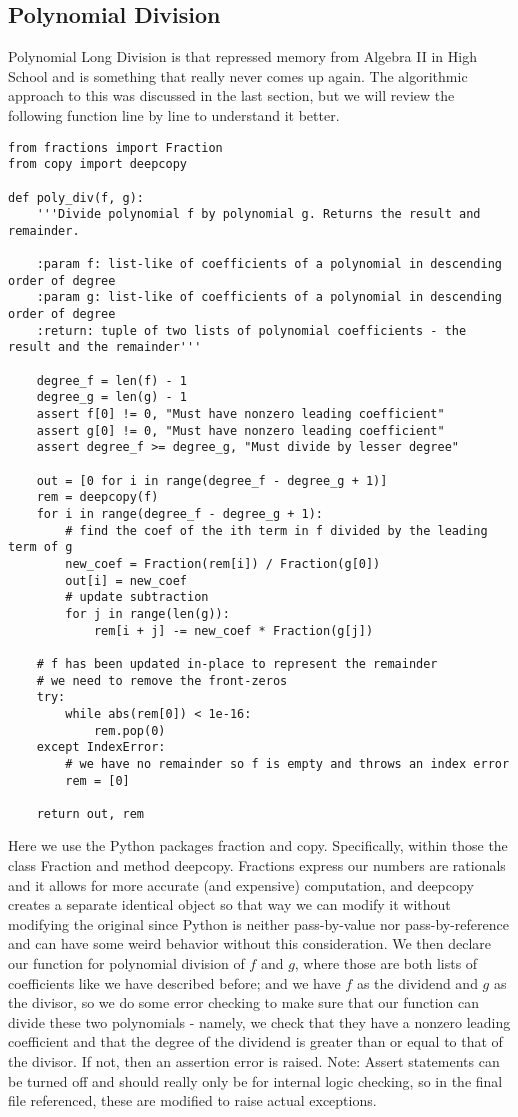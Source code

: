 \documentclass[]{article}
\theoremstyle{definition}
\begin{document}
\subsection{Polynomial Division}
Polynomial Long Division is that repressed memory from Algebra II in High School and is something that really never comes up again. The algorithmic approach to this was discussed in the last section, but we will review the following function line by line to understand it better.
\begin{lstlisting}
from fractions import Fraction
from copy import deepcopy

def poly_div(f, g):
    '''Divide polynomial f by polynomial g. Returns the result and remainder.
    
    :param f: list-like of coefficients of a polynomial in descending order of degree
    :param g: list-like of coefficients of a polynomial in descending order of degree
    :return: tuple of two lists of polynomial coefficients - the result and the remainder'''
    
    degree_f = len(f) - 1
    degree_g = len(g) - 1
    assert f[0] != 0, "Must have nonzero leading coefficient"
    assert g[0] != 0, "Must have nonzero leading coefficient"
    assert degree_f >= degree_g, "Must divide by lesser degree"
    
    out = [0 for i in range(degree_f - degree_g + 1)]
    rem = deepcopy(f)
    for i in range(degree_f - degree_g + 1):
        # find the coef of the ith term in f divided by the leading term of g
        new_coef = Fraction(rem[i]) / Fraction(g[0])
        out[i] = new_coef
        # update subtraction
        for j in range(len(g)):
            rem[i + j] -= new_coef * Fraction(g[j])

    # f has been updated in-place to represent the remainder
    # we need to remove the front-zeros
    try:
        while abs(rem[0]) < 1e-16:
            rem.pop(0)
    except IndexError:
        # we have no remainder so f is empty and throws an index error
        rem = [0]
        
    return out, rem
\end{lstlisting}
Here we use the Python packages fraction and copy. Specifically, within those the class Fraction and method deepcopy. Fractions express our numbers are rationals and it allows for more accurate (and expensive) computation, and deepcopy creates a separate identical object so that way we can modify it without modifying the original since Python is neither pass-by-value nor pass-by-reference and can have some weird behavior without this consideration. We then declare our function for polynomial division of $f$ and $g$, where those are both lists of coefficients like we have described before; and we have $f$ as the dividend and $g$ as the divisor, so we do some error checking to make sure that our function can divide these two polynomials - namely, we check that they have a nonzero leading coefficient and that the degree of the dividend is greater than or equal to that of the divisor. If not, then an assertion error is raised. Note: Assert statements can be turned off and should really only be for internal logic checking, so in the final file referenced, these are modified to raise actual exceptions.
\end{document}
